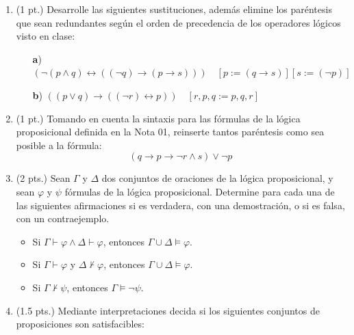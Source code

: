 \documentclass[11pt,letterpaper]{article}
\begin{document}
\begin{enumerate}
  \item (1 pt.) Desarrolle las siguientes sustituciones, además elimine los paréntesis que sean redundantes según el orden de precedencia de los operadores lógicos visto en clase:
    
    \begin{itemize}
    \item[\textbf{a})] $\left( \neg (p \land q) \leftrightarrow \left( (\neg q) \rightarrow (p \rightarrow s) \right) \right) \quad [p := (q \rightarrow s)] [s := (\neg p)]$
      
    \item[\textbf{b})] $\left( (p \lor q) \rightarrow ((\neg r) \leftrightarrow p) \right) \quad [r, p, q := p, q, r]$
    \end{itemize}
    
    \bigskip

  \item (1 pt.) Tomando en cuenta la sintaxis para las fórmulas de la lógica proposicional definida en la Nota 01, reinserte tantos paréntesis como sea posible a la fórmula:
    \[
    (q \rightarrow p \rightarrow \neg r \land s) \lor \neg p
    \]

  \bigskip

  \item (2 pts.) Sean $\Gamma$ y $\Delta$ dos conjuntos de oraciones de la lógica proposicional, y sean $\varphi$ y $\psi$ fórmulas de la lógica proposicional. Determine para cada una de las siguientes afirmaciones si es verdadera, con una demostración, o si es falsa, con un contraejemplo.

    \begin{itemize}
       \item Si $\Gamma \vdash \varphi \land \Delta \vdash \varphi$, entonces $\Gamma \cup \Delta \models \varphi$.
       \item Si $\Gamma \vdash \varphi$ y $\Delta \not\vdash \varphi$, entonces $\Gamma \cup \Delta \models \varphi$.
       \item Si $\Gamma \not\vdash \psi$, entonces $\Gamma \models \neg \psi$.
    \end{itemize}

  \bigskip

  \item (1.5 pts.) Mediante interpretaciones decida si los siguientes conjuntos de proposiciones son satisfacibles:


\end{enumerate}
\end{document}
